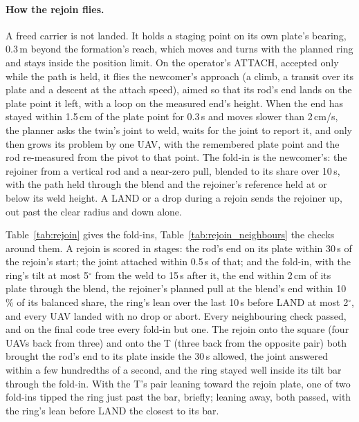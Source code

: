 \paragraph{How the rejoin flies.} %
A freed carrier is not landed. It holds a staging point on its own plate's bearing, 0.3\,m beyond the formation's
reach, which moves and turns with the planned ring and stays inside the position limit. On the operator's ATTACH,
accepted only while the path is held, it flies the newcomer's approach (a climb, a transit over its plate and a
descent at the attach speed), aimed so that its rod's end lands on the plate point it left, with a loop on the
measured end's height. When the end has stayed within 1.5\,cm of the plate point for 0.3\,s and moves slower than
2\,cm/s, the planner asks the twin's joint to weld, waits for the joint to report it, and only then grows its
problem by one UAV, with the remembered plate point and the rod re-measured from the pivot to that point. The fold-in
is the newcomer's: the rejoiner from a vertical rod and a near-zero pull, blended to its share over 10\,s, with the
path held through the blend and the rejoiner's reference held at or below its weld height. A LAND or a drop during a
rejoin sends the rejoiner up, out past the clear radius and down alone.

Table~\ref{tab:rejoin} gives the fold-ins, Table~\ref{tab:rejoin_neighbours} the checks around them. A rejoin is
scored in stages: the rod's end on its plate within 30\,s of the rejoin's start; the joint attached within 0.5\,s of
that; and the fold-in, with the ring's tilt at most 5$^\circ$ from the weld to 15\,s after it, the end within 2\,cm of
its plate through the blend, the rejoiner's planned pull at the blend's end within 10\,\% of its balanced share, the
ring's lean over the last 10\,s before LAND at most 2$^\circ$, and every UAV landed with no drop or abort. Every
neighbouring check passed, and on the final code tree every fold-in but one. The rejoin onto the square (four UAVs back from
three) and onto the T (three back from the opposite pair) both brought the rod's end to its plate inside the 30\,s
allowed, the joint answered within a few hundredths of a second, and the ring stayed well inside its tilt bar through
the fold-in. With the T's pair leaning toward the rejoin plate, one of two fold-ins tipped the ring just past the bar,
briefly; leaning away, both passed, with the ring's lean before LAND the closest to its bar.

